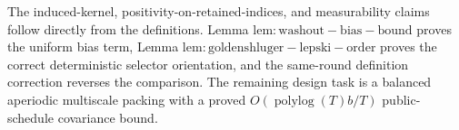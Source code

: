 The induced-kernel, positivity-on-retained-indices, and measurability claims follow directly from the definitions. Lemma \(\mathrm{lem:washout-bias-bound}\) proves the uniform bias term, Lemma \(\mathrm{lem:goldenshluger-lepski-order}\) proves the correct deterministic selector orientation, and the same-round definition correction reverses the comparison. The remaining design task is a balanced aperiodic multiscale packing with a proved \(O(\operatorname{polylog}(T)b/T)\) public-schedule covariance bound.